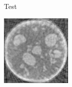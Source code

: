 \documentclass{article}
\begin{document}
\begin{figure}[!h]
    \begin{subfigure}[b]{0.4\linewidth}
        \caption{Test}
     \end{subfigure}
\quad
    \begin{subfigure}[b]{0.4\linewidth}
        \includegraphics[width=\textwidth]{../images/sprouts/fdkIm.png}

\end{subfigure}
\end{figure}
\end{document}

